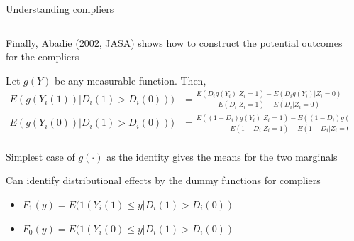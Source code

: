 \documentclass[notes,11pt, aspectratio=169]{beamer}
\newenvironment{wideitemize}{\itemize\addtolength{\itemsep}{10pt}}{\enditemize}
\begin{document}
\begin{frame}{Understanding compliers}
  \begin{columns}[T] %
    \begin{column}{0.9\textwidth}
      \begin{wideitemize}
      \item Finally, Abadie (2002, JASA)  shows how to construct the potential outcomes for the compliers
      \item Let $g(Y)$ be any measurable function. Then,
        \begin{align*}
         E(g(Y_{i}(1)) | D_{i}(1) > D_{i}(0))) &= \frac{E(D_{i}g(Y_{i})|Z_{i} = 1) - E(D_{i}g(Y_{i})|Z_{i} = 0)}{E(D_{i}|Z_{i} = 1) - E(D_{i}|Z_{i}=0)}\\
         E(g(Y_{i}(0)) | D_{i}(1) > D_{i}(0))) &= \frac{E((1-D_{i})g(Y_{i})|Z_{i} = 1) - E((1-D_{i})g(Y_{i})|Z_{i} = 0)}{E(1-D_{i}|Z_{i} = 1) - E(1-D_{i}|Z_{i}=0)}\\
        \end{align*}
      \item Simplest case of $g(\cdot)$ as the identity gives the means for the two marginals
      \item Can identify distributional effects by the
        dummy functions for compliers
        \begin{itemize}
        \item         $F_{1}(y) = E(1(Y_{i}(1) \leq y | D_{i}(1) > D_{i}(0))$
        \item         $F_{0}(y) = E(1(Y_{i}(0) \leq y | D_{i}(1) > D_{i}(0))$
        \end{itemize}
      \end{wideitemize}
\end{column}
\begin{column}{0.3\textwidth}
\end{column}
\end{columns}
\end{frame}
\end{document}
